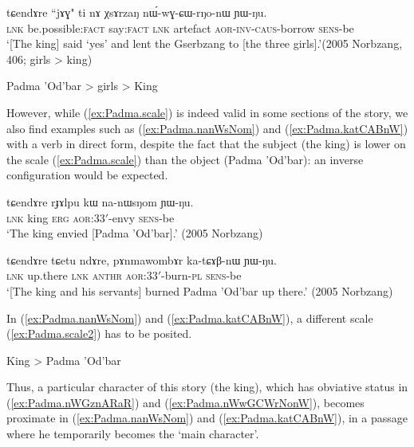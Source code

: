 \begin{exe}
\ex \label{ex:Padma.nWwGCWrNonW}
\gll  tɕendɤre ``jɤɣ" ti nɤ χsɤrzaŋ nɯ́-wɣ-ɕɯ-rŋo-nɯ ɲɯ-ŋu. \\
\textsc{lnk} be.possible:\textsc{fact} say:\textsc{fact} \textsc{lnk} artefact \textsc{aor}-\textsc{inv}-\textsc{caus}-borrow \textsc{sens}-be \\
\glt `[The king] said `yes' and lent the Gserbzang to [the three girls].'(2005 Norbzang, 406; girls > king)
\end{exe}

\begin{exe}
\ex \label{ex:Padma.scale}
\glt Padma 'Od'bar > girls > King
\end{exe}

However, while (\ref{ex:Padma.scale}) is indeed valid in some sections of the story, we also find examples such as (\ref{ex:Padma.nanWsNom}) and (\ref{ex:Padma.katCABnW}) with a verb in direct form, despite the fact that the subject (the king) is lower on the scale (\ref{ex:Padma.scale}) than the object (Padma 'Od'bar): an inverse configuration would be expected.

\begin{exe}
\ex \label{ex:Padma.nanWsNom}
\gll tɕendɤre rɟɤlpu kɯ na-nɯsŋom ɲɯ-ŋu. \\
\textsc{lnk} king \textsc{erg} \textsc{aor}:3\fl{}3$'$-envy \textsc{sens}-be \\
\glt `The king envied [Padma 'Od'bar].' (2005 Norbzang)
\end{exe}

\begin{exe}
\ex \label{ex:Padma.katCABnW}
\gll tɕendɤre tɕetu ndɤre, pɤnmawombɤr ka-tɕɤβ-nɯ ɲɯ-ŋu.  \\
\textsc{lnk} up.there \textsc{lnk}  \textsc{anthr} \textsc{aor}:3\fl{}3$'$-burn-\textsc{pl} \textsc{sens}-be \\
\glt `[The king and his servants] burned Padma 'Od'bar up there.' (2005 Norbzang)
\end{exe}

In (\ref{ex:Padma.nanWsNom}) and (\ref{ex:Padma.katCABnW}), a different scale (\ref{ex:Padma.scale2}) has to be posited.

\begin{exe}
\ex \label{ex:Padma.scale2}
\glt King > Padma 'Od'bar 
\end{exe}

Thus, a particular character of this story (the king), which has obviative status in (\ref{ex:Padma.nWGznARaR}) and (\ref{ex:Padma.nWwGCWrNonW}), becomes proximate in (\ref{ex:Padma.nanWsNom}) and (\ref{ex:Padma.katCABnW}), in a passage where he temporarily becomes the `main character'.

